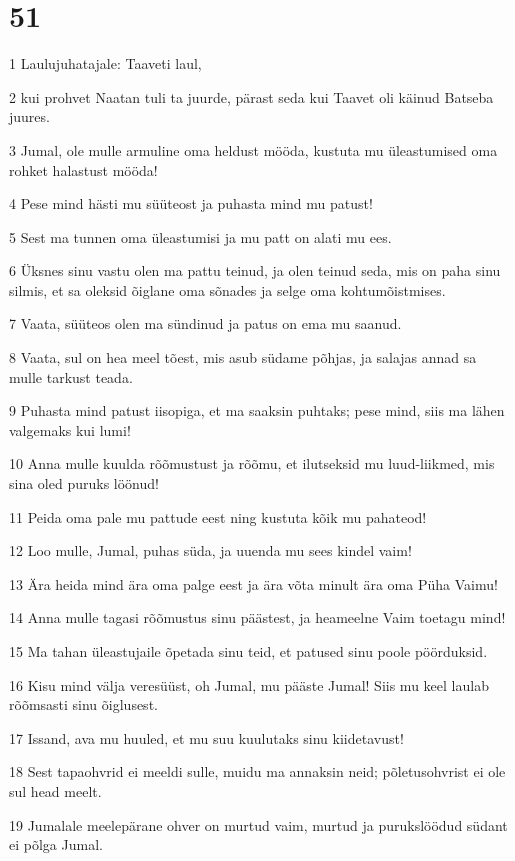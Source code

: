 \chapter{51}

\par 1 Laulujuhatajale: Taaveti laul,
\par 2 kui prohvet Naatan tuli ta juurde, pärast seda kui Taavet oli käinud Batseba juures.
\par 3 Jumal, ole mulle armuline oma heldust mööda, kustuta mu üleastumised oma rohket halastust mööda!
\par 4 Pese mind hästi mu süüteost ja puhasta mind mu patust!
\par 5 Sest ma tunnen oma üleastumisi ja mu patt on alati mu ees.
\par 6 Üksnes sinu vastu olen ma pattu teinud, ja olen teinud seda, mis on paha sinu silmis, et sa oleksid õiglane oma sõnades ja selge oma kohtumõistmises.
\par 7 Vaata, süüteos olen ma sündinud ja patus on ema mu saanud.
\par 8 Vaata, sul on hea meel tõest, mis asub südame põhjas, ja salajas annad sa mulle tarkust teada.
\par 9 Puhasta mind patust iisopiga, et ma saaksin puhtaks; pese mind, siis ma lähen valgemaks kui lumi!
\par 10 Anna mulle kuulda rõõmustust ja rõõmu, et ilutseksid mu luud-liikmed, mis sina oled puruks löönud!
\par 11 Peida oma pale mu pattude eest ning kustuta kõik mu pahateod!
\par 12 Loo mulle, Jumal, puhas süda, ja uuenda mu sees kindel vaim!
\par 13 Ära heida mind ära oma palge eest ja ära võta minult ära oma Püha Vaimu!
\par 14 Anna mulle tagasi rõõmustus sinu päästest, ja heameelne Vaim toetagu mind!
\par 15 Ma tahan üleastujaile õpetada sinu teid, et patused sinu poole pöörduksid.
\par 16 Kisu mind välja veresüüst, oh Jumal, mu pääste Jumal! Siis mu keel laulab rõõmsasti sinu õiglusest.
\par 17 Issand, ava mu huuled, et mu suu kuulutaks sinu kiidetavust!
\par 18 Sest tapaohvrid ei meeldi sulle, muidu ma annaksin neid; põletusohvrist ei ole sul head meelt.
\par 19 Jumalale meelepärane ohver on murtud vaim, murtud ja purukslöödud südant ei põlga Jumal.

